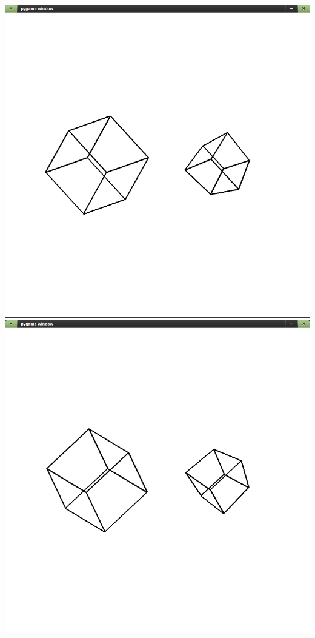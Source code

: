 \documentclass[a4paper,14pt,english,crop=false]{standalone}
\begin{document}
\includegraphics[width=\textwidth]{figures/pygame_window_063}
\includegraphics[width=\textwidth]{figures/pygame_window_064}
\end{document}

